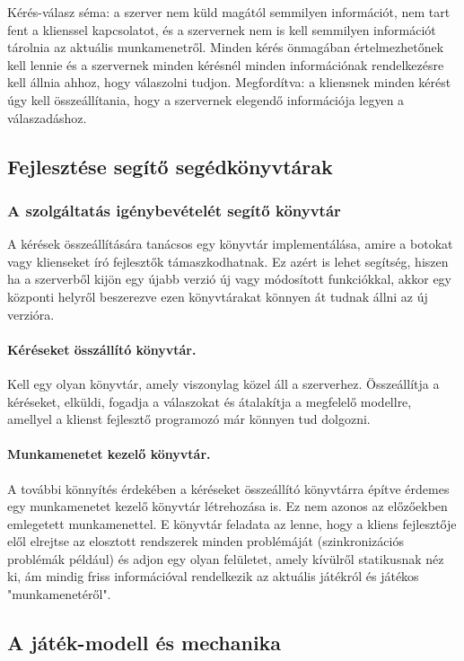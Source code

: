 \documentclass[twoside, a4paper, 12pt]{article}
\begin{document}
Kérés-válasz séma: a szerver nem küld magától semmilyen információt, nem tart fent a klienssel kapcsolatot, és a szervernek nem is kell semmilyen információt tárolnia az aktuális munkamenetről. Minden kérés önmagában értelmezhetőnek kell lennie és a szervernek minden kérésnél minden információnak rendelkezésre kell állnia ahhoz, hogy válaszolni tudjon. Megfordítva: a kliensnek minden kérést úgy kell összeállítania, hogy a szervernek elegendő információja legyen a válaszadáshoz.

\subsection{Fejlesztése segítő segédkönyvtárak}
\subsubsection{A szolgáltatás igénybevételét segítő könyvtár}
A kérések összeállítására tanácsos egy könyvtár implementálása, amire a botokat vagy klienseket író fejlesztők támaszkodhatnak. Ez azért is lehet segítség, hiszen ha a szerverből kijön egy újabb verzió új vagy módosított funkciókkal, akkor egy központi helyről beszerezve ezen könyvtárakat könnyen át tudnak állni az új verzióra.

\paragraph{Kéréseket összállító könyvtár.}
Kell egy olyan könyvtár, amely viszonylag közel áll a szerverhez. Összeállítja a kéréseket, elküldi, fogadja a válaszokat és átalakítja a megfelelő modellre, amellyel a klienst fejlesztő programozó már könnyen tud dolgozni.

\paragraph{Munkamenetet kezelő könyvtár.}
A további könnyítés érdekében a kéréseket összeállító könyvtárra építve érdemes egy munkamenetet kezelő könyvtár létrehozása is. Ez nem azonos az előzőekben emlegetett munkamenettel. E könyvtár feladata az lenne, hogy a kliens fejlesztője elől elrejtse az elosztott rendszerek minden problémáját (szinkronizációs problémák például) és adjon egy olyan felületet, amely kívülről statikusnak néz ki, ám mindig friss információval rendelkezik az aktuális játékról és játékos "munkamenetéről".

\subsection{A játék-modell és mechanika}
\end{document}
